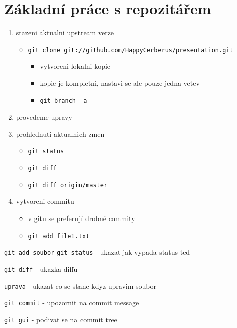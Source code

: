 \documentclass[10pt]{article}
\begin{document}
\section{Základní práce s repozitářem}
\begin{enumerate}
\item stazeni aktualni upstream verze
\begin{itemize}
	\item \texttt{git clone git://github.com/HappyCerberus/presentation.git}
	\begin{itemize}
		\item vytvoreni lokalni kopie
		\item kopie je kompletni, nastavi se ale pouze jedna vetev
		\item \texttt{git branch -a}
	\end{itemize}
\end{itemize}

\item{provedeme upravy}
\item{prohlednuti aktualnich zmen}
\begin{itemize}
	\item \texttt{git status}
	\item \texttt{git diff}
	\item \texttt{git diff origin/master}
\end{itemize}

\item{vytvoreni commitu}
\begin{itemize}
	\item v gitu se preferují drobné commity
	\item \texttt{git add file1.txt}
\end{itemize}
\end{enumerate}

\texttt{git add soubor}
\texttt{git status}
- ukazat jak vypada status ted

\texttt{git diff}
- ukazka diffu

\texttt{uprava}
- ukazat co se stane kdyz upravim soubor

\texttt{git commit}
- upozornit na commit message

\texttt{git gui}
- podivat se na commit tree
\end{document}
